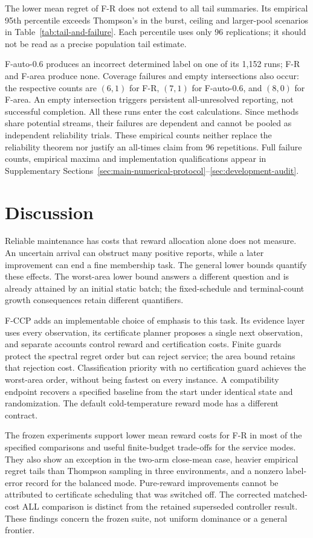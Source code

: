 \documentclass[11pt]{article}
\theoremstyle{remark}
\begin{document}
The lower mean regret of F-R does not extend to all tail summaries. Its empirical 95th percentile exceeds Thompson's in the burst, ceiling and larger-pool scenarios in Table~\ref{tab:tail-and-failure}. Each percentile uses only 96 replications; it should not be read as a precise population tail estimate.

F-auto-0.6 produces an incorrect determined label on one of its 1,152 runs; F-R and F-area produce none. Coverage failures and empty intersections also occur: the respective counts are $(6,1)$ for F-R, $(7,1)$ for F-auto-0.6, and $(8,0)$ for F-area. An empty intersection triggers persistent all-unresolved reporting, not successful completion. All these runs enter the cost calculations. Since methods share potential streams, their failures are dependent and cannot be pooled as independent reliability trials. These empirical counts neither replace the reliability theorem nor justify an all-times claim from 96 repetitions. Full failure counts, empirical maxima and implementation qualifications appear in Supplementary Sections~\ref{sec:main-numerical-protocol}--\ref{sec:development-audit}.
\section{Discussion}
\label{sec:discussion}

Reliable maintenance has costs that reward allocation alone does not
measure. An uncertain arrival can obstruct many positive reports, while
a later improvement can end a fine membership task. The general lower
bounds quantify these effects. The worst-area lower bound answers a
different question and is already attained by an initial static batch;
the fixed-schedule and terminal-count growth consequences retain
different quantifiers.

F-CCP adds an implementable choice of emphasis to this task. Its evidence
layer uses every observation, its certificate planner proposes a single
next observation, and separate accounts control reward and certification
costs. Finite guards protect the spectral regret order but can reject
service; the area bound retains that rejection cost. Classification
priority with no certification guard achieves the worst-area order,
without being fastest on every instance. A compatibility endpoint
recovers a specified baseline from the start under identical state and
randomization. The default cold-temperature reward mode has a different
contract.

The frozen experiments support lower mean reward costs for F-R in most
of the specified comparisons and useful finite-budget trade-offs for
the service modes. They also show an exception in the two-arm close-mean
case, heavier empirical regret tails than Thompson sampling in three
environments, and a nonzero label-error record for the balanced mode.
Pure-reward improvements cannot be attributed to certificate scheduling
that was switched off. The corrected matched-cost ALL comparison is
distinct from the retained superseded controller result. These findings
concern the frozen suite, not uniform dominance or a general frontier.
\end{document}
